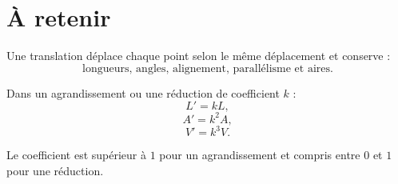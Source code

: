 \section{À retenir}

\begin{aretenir}
Une translation déplace chaque point selon le même déplacement et conserve :
\[
\boxed{\text{longueurs, angles, alignement, parallélisme et aires}}.
\]

Dans un agrandissement ou une réduction de coefficient $k$ :
\[
\boxed{L'=kL},
\]
\[
\boxed{A'=k^2A},
\]
\[
\boxed{V'=k^3V}.
\]

Le coefficient est supérieur à $1$ pour un agrandissement et compris entre $0$ et $1$ pour une réduction.
\end{aretenir}
